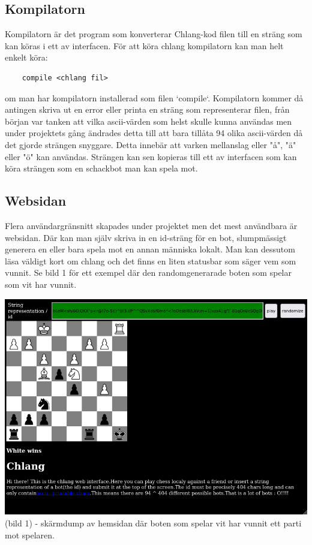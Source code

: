 \documentclass{article}
\begin{document}
	
	\subsection{Kompilatorn}
    Kompilatorn är det program som konverterar Chlang-kod filen till en sträng som kan köras i ett av interfacen. För att köra chlang kompilatorn kan man helt enkelt köra:
    \begin{lstlisting}
    compile <chlang fil>
    \end{lstlisting}
    om man har kompilatorn installerad som filen `compile`.
    Kompilatorn kommer då antingen skriva ut en error eller printa en sträng som representerar filen, från början var tanken att vilka ascii-värden som helst skulle kunna användas men under projektets gång ändrades detta till att bara tillåta 94 olika ascii-värden då det gjorde strängen snyggare. Detta innebär att varken mellanslag eller "å", "ä" eller "ö" kan användas. Strängen kan sen kopieras till ett av interfacen som kan köra strängen som en schackbot man kan spela mot.
        
	\subsection{Websidan}
    Flera användargränsnitt skapades under projektet men det mest användbara är websidan. Där kan man själv skriva in en id-sträng för en bot, slumpmässigt generera en eller bara spela mot en annan människa lokalt.
    Man kan dessutom läsa väldigt kort om chlang och det finns en liten statusbar som säger vem som vunnit. Se bild 1 för ett exempel där den randomgenerarade boten som spelar som vit har vunnit.
    
    \includegraphics[width=\textwidth]{./images/web.png}
    (bild 1) - skärmdump av hemsidan där boten som spelar vit har vunnit ett parti mot spelaren.
\end{document}
